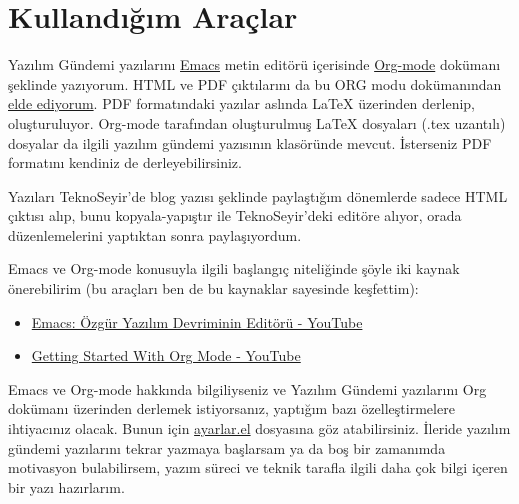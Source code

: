\documentclass[11pt]{article}
\begin{document}
\section*{Kullandığım Araçlar}
\label{sec:orgfdcb8fe}
Yazılım Gündemi yazılarını \href{https://www.gnu.org/software/emacs/}{Emacs} metin editörü içerisinde \href{https://orgmode.org}{Org-mode} dokümanı
şeklinde yazıyorum. HTML ve PDF çıktılarını da bu ORG modu dokümanından \href{https://orgmode.org/manual/Exporting.html\#Exporting}{elde
ediyorum}. PDF formatındaki yazılar aslında \LaTeX{} üzerinden derlenip,
oluşturuluyor. Org-mode tarafından oluşturulmuş \LaTeX{} dosyaları (.tex
uzantılı) dosyalar da ilgili yazılım gündemi yazısının klasöründe mevcut.
İsterseniz PDF formatını kendiniz de derleyebilirsiniz.

Yazıları TeknoSeyir'de blog yazısı şeklinde paylaştığım dönemlerde sadece HTML
çıktısı alıp, bunu kopyala-yapıştır ile TeknoSeyir'deki editöre alıyor, orada
düzenlemelerini yaptıktan sonra paylaşıyordum.

Emacs ve Org-mode konusuyla ilgili başlangıç niteliğinde şöyle iki kaynak
önerebilirim (bu araçları ben de bu kaynaklar sayesinde keşfettim):
\begin{itemize}
\item \href{https://www.youtube.com/watch?v=FsN3Yp05\_aQ}{Emacs: Özgür Yazılım Devriminin Editörü - YouTube}
\item \href{https://www.youtube.com/watch?v=SzA2YODtgK4}{Getting Started With Org Mode - YouTube}
\end{itemize}

Emacs ve Org-mode hakkında bilgiliyseniz ve Yazılım Gündemi yazılarını Org
dokümanı üzerinden derlemek istiyorsanız, yaptığım bazı özelleştirmelere
ihtiyacınız olacak. Bunun için \href{ayarlar.el}{ayarlar.el} dosyasına göz atabilirsiniz.
İleride yazılım gündemi yazılarını tekrar yazmaya başlarsam ya da boş bir
zamanımda motivasyon bulabilirsem, yazım süreci ve teknik tarafla ilgili daha
çok bilgi içeren bir yazı hazırlarım.
\end{document}
